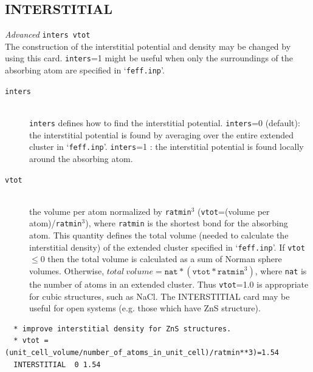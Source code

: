 \documentclass[11pt,oneside]{report} %
\newenvironment{Card}[4]%
      {\vspace{3ex}%
        \subsection{#1}
        \quad\textsl{#3}\newline
        \quad\texttt{#2}\newline%
        \label{card:#4}\\}
      {}
\newcommand{\file}[1]{`\texttt{#1}'}
\begin{document}
\begin{Card}{INTERSTITIAL}{inters vtot}{Advanced}{int}
  The construction of the interstitial potential and density may be
  changed by using this card.
  \texttt{inters}=1 might be useful when only the surroundings of the absorbing
  atom are specified in \file{feff.inp}.
  \begin{description}
  \item[\texttt{inters}]\hfill\\ \texttt{inters} defines how to 
    find the interstitial potential. \texttt{inters}=0 (default): the interstitial 
    potential is found by averaging over the entire extended cluster in 
    \file{feff.inp}. \texttt{inters}=1 : the interstitial potential is found locally 
    around the absorbing atom.
  \item[\texttt{vtot}]\hfill\\ the volume per atom normalized
   by \texttt{ratmin}$^3$ (\texttt{vtot}=(volume per atom)/\texttt{ratmin}$^3$),
    where \texttt{ratmin} is the shortest bond for the absorbing atom. This 
    quantity defines the total volume (needed to calculate the interstitial 
    density) of the extended cluster specified in \file{feff.inp}. If \texttt{vtot} 
    $\leq0$ then the total volume is calculated as a sum of Norman sphere volumes. 
    Otherwise, $total\ volume = \mathtt{nat} * (\mathtt{vtot}*\mathtt{ratmin}^3)$,
    where \texttt{nat} is the number of atoms in an extended cluster. Thus 
    \texttt{vtot}=1.0 is appropriate for cubic structures, such as NaCl. The 
    INTERSTITIAL card may be useful for open systems (e.g. those which have ZnS 
    structure).
  \end{description}

\begin{verbatim}
  * improve interstitial density for ZnS structures.
  * vtot = (unit_cell_volume/number_of_atoms_in_unit_cell)/ratmin**3)=1.54
  INTERSTITIAL  0 1.54
\end{verbatim}
\end{Card}
\end{document}
